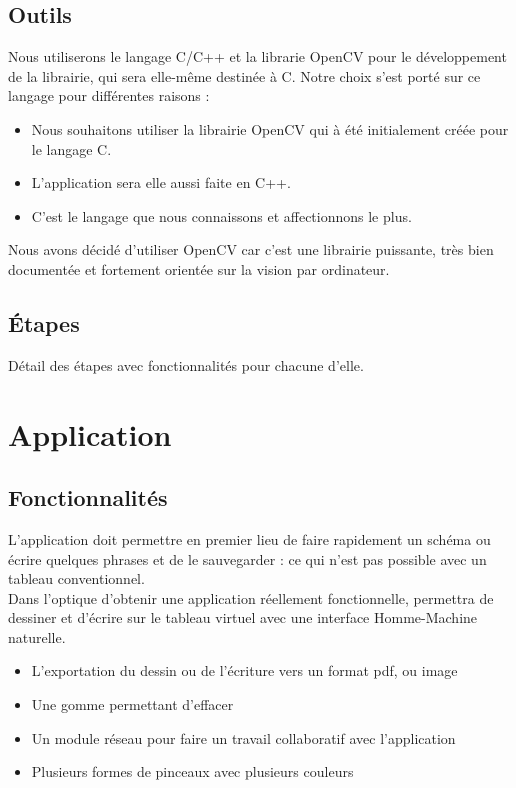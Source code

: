 \documentclass{article}
\begin{document}
		\subsection{Outils}
			Nous utiliserons le langage C/C++ et la librarie OpenCV pour le développement de la librairie, qui sera elle-même destinée à C.
Notre choix s'est porté sur ce langage pour différentes raisons :
		\begin{itemize}
			\item Nous souhaitons utiliser la librairie OpenCV qui à été initialement créée pour le langage C.
			\item L'application sera elle aussi faite en C++.
		\item C'est le langage que nous connaissons et affectionnons le plus.
			\end{itemize}
			Nous avons décidé d'utiliser OpenCV car c'est une librairie puissante, très bien documentée et fortement orientée sur la vision par ordinateur. \\
		\subsection{Étapes}
			Détail des étapes avec fonctionnalités pour chacune d'elle.
	\section{Application}
		\subsection{Fonctionnalités}
		L'application doit permettre en premier lieu de faire rapidement un schéma ou écrire quelques phrases
et de le sauvegarder : ce qui n'est pas possible avec un tableau conventionnel. \\ 			
		Dans l'optique d'obtenir une application réellement fonctionnelle, permettra de dessiner 
et d'écrire sur le tableau virtuel avec une interface Homme-Machine naturelle. \\

		\begin{itemize}
			\item L'exportation du dessin ou de l'écriture vers un format pdf, ou image
			\item Une gomme permettant d'effacer	
			\item Un module réseau pour faire un travail collaboratif avec l'application
			\item Plusieurs formes de pinceaux avec plusieurs couleurs
		\end{itemize}
\end{document}
